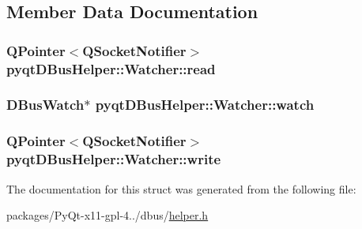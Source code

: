 \subsection{Member Data Documentation}
\hypertarget{structpyqtDBusHelper_1_1Watcher_aedb0e7edf589c338ecfc5a4757bdb257}{}
\subsubsection[{read}]{\setlength{\rightskip}{0pt plus 5cm}Q\+Pointer$<$Q\+Socket\+Notifier$>$ pyqt\+D\+Bus\+Helper\+::\+Watcher\+::read}\label{structpyqtDBusHelper_1_1Watcher_aedb0e7edf589c338ecfc5a4757bdb257}
\hypertarget{structpyqtDBusHelper_1_1Watcher_a9aa714601ff7ff4a9512d68724f8ff32}{}
\subsubsection[{watch}]{\setlength{\rightskip}{0pt plus 5cm}D\+Bus\+Watch$\ast$ pyqt\+D\+Bus\+Helper\+::\+Watcher\+::watch}\label{structpyqtDBusHelper_1_1Watcher_a9aa714601ff7ff4a9512d68724f8ff32}
\hypertarget{structpyqtDBusHelper_1_1Watcher_aea6c1f64de2f9ba549d56798d93fb679}{}
\subsubsection[{write}]{\setlength{\rightskip}{0pt plus 5cm}Q\+Pointer$<$Q\+Socket\+Notifier$>$ pyqt\+D\+Bus\+Helper\+::\+Watcher\+::write}\label{structpyqtDBusHelper_1_1Watcher_aea6c1f64de2f9ba549d56798d93fb679}


The documentation for this struct was generated from the following file\+:\begin{DoxyCompactItemize}
\item 
packages/\+Py\+Qt-\/x11-\/gpl-\/4../dbus/\hyperlink{helper_8h}{helper.\+h}\end{DoxyCompactItemize}
